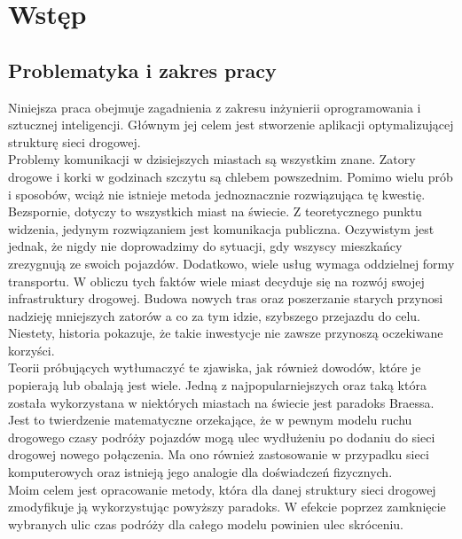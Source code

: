 \documentclass[twoside,12pt]{report}
\begin{document}


\tableofcontents	%

\chapter{Wstęp} \label{rozdz.wstep} 

\section{Problematyka i zakres pracy}

Niniejsza praca obejmuje zagadnienia z zakresu inżynierii oprogramowania i sztucznej inteligencji. Głównym jej celem jest stworzenie aplikacji optymalizującej strukturę sieci drogowej.\\

Problemy komunikacji w dzisiejszych miastach są wszystkim znane. Zatory drogowe i korki w godzinach szczytu są chlebem powszednim. Pomimo wielu prób i sposobów, wciąż nie istnieje metoda jednoznacznie rozwiązująca tę kwestię. Bezspornie, dotyczy to wszystkich miast na świecie. Z teoretycznego punktu widzenia, jedynym rozwiązaniem jest komunikacja publiczna. Oczywistym jest jednak, że nigdy nie doprowadzimy do sytuacji, gdy wszyscy mieszkańcy zrezygnują ze swoich pojazdów. Dodatkowo, wiele usług wymaga oddzielnej formy transportu. W obliczu tych faktów wiele miast decyduje się na rozwój swojej infrastruktury drogowej. Budowa nowych tras oraz poszerzanie starych przynosi nadzieję mniejszych zatorów a co za tym idzie, szybszego przejazdu do celu. Niestety, historia pokazuje, że takie inwestycje nie zawsze przynoszą oczekiwane korzyści.\\

Teorii próbujących wytłumaczyć te zjawiska, jak również dowodów, które je popierają lub obalają jest wiele. Jedną z najpopularniejszych oraz taką która została wykorzystana w niektórych miastach na świecie jest paradoks Braessa\cite{braess}. Jest to twierdzenie matematyczne orzekające, że w pewnym modelu ruchu drogowego czasy podróży pojazdów mogą ulec wydłużeniu po dodaniu do sieci drogowej nowego połączenia. Ma ono również  zastosowanie w przypadku  sieci komputerowych oraz istnieją jego analogie dla doświadczeń fizycznych.\\

Moim celem jest opracowanie metody, która dla danej struktury sieci drogowej zmodyfikuje ją wykorzystując powyższy paradoks. W efekcie poprzez zamknięcie wybranych ulic czas podróży dla całego modelu powinien ulec skróceniu.
\end{document}
